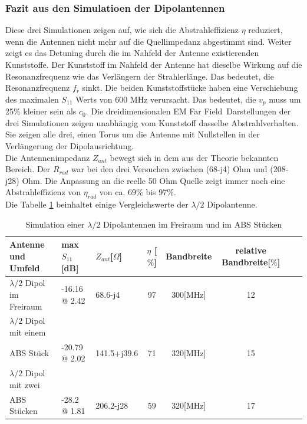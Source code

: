 \subsubsection{Fazit aus den Simulatioen der Dipolantennen}
Diese drei Simulationen zeigen auf, wie sich die Abstrahleffizienz $\eta$ reduziert, wenn die Antennen nicht mehr auf die Quellimpedanz abgestimmt sind. Weiter zeigt es das Detuning durch die im Nahfeld der Antenne existierenden Kunststoffe. Der Kunststoff im Nahfeld der Antenne hat dieselbe Wirkung auf die Resonanzfrequenz wie das Verlängern der  Strahlerlänge. Das bedeutet, die Resonanzfrequenz $f_{r}$ sinkt.  Die beiden Kunststoffstücke haben eine Verschiebung des maximalen $S_{11}$ Werts von 600 MHz verursacht. Das bedeutet, die $v_p$ muss um 25\% kleiner sein als $c_0$.
Die dreidimensionalen \glqq EM Far Field\grqq \  Darstellungen der drei Simulationen zeigen unabhängig vom Kunststoff dasselbe Abstrahlverhalten. Sie zeigen alle drei, einen Torus um die Antenne mit Nullstellen in der Verlängerung der Dipolausrichtung.\\
Die Antennenimpedanz $Z_{ant}$ bewegt sich in dem aus der Theorie bekannten Bereich. Der $R_{rad}$ war bei den drei Versuchen zwischen (68-j4) Ohm und  (208-j28) Ohm. Die Anpassung an die reelle 50 Ohm Quelle zeigt immer noch eine Abstrahleffizienz von $\eta_{rad}$ von   ca. 69\% bis 97\%.\\

Die Tabelle \ref{tab:Evaluation_Vergeich_Dipolantennen} beinhaltet einige Vergleichswerte der $\lambda/2$ Dipolantenne.
\begin{table}[!h]
  \centering
  \begin{tabular}{p{4cm} p{2cm} l  c c c c r} 
  \toprule 
  Antenne und Umfeld             & max $S_{11}$[dB]		& $Z_{ant}$[$\Omega$] 	& $\eta$ [$\%$] & Bandbreite & relative Bandbreite[$\%$]\\ 
  \midrule
$\lambda/2$ Dipol im Freiraum    			&	-16.16 @ 2.42		&  	68.6-j4			&   	97	&	300[MHz] & 12\\         		
$\lambda/2$ Dipol mit einem \\ABS Stück 	&   -20.79 @ 2.02  		&	141.5+j39.6		&	71	&	320[MHz]	 & 15\\
$\lambda/2$ Dipol mit zwei \\ABS Stücken 	&   -28.2 @ 1.81    	&	206.2-j28		&	59	&	320[MHz]	 & 17\\
 \bottomrule
  \end{tabular}
  \caption{Simulation einer $\lambda/2$ Dipolantennen im Freiraum und im ABS Stücken}
  \label{tab:Evaluation_Vergeich_Dipolantennen}
\end{table}



